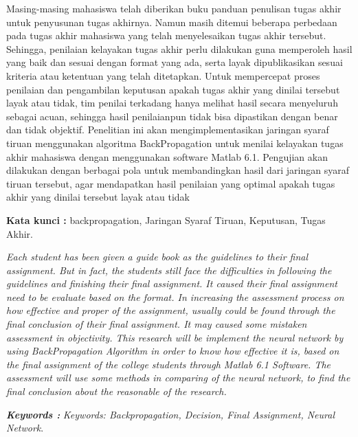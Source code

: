 \documentclass{jtetiskripsi}
\begin{document}
\tableofcontents
{}
\listoffigures
{}


\begin{abstractind}
Masing-masing mahasiswa telah diberikan buku panduan penulisan tugas akhir untuk
penyusunan tugas akhirnya. Namun masih ditemui beberapa perbedaan pada tugas akhir
mahasiswa yang telah menyelesaikan tugas akhir tersebut. Sehingga, penilaian kelayakan tugas
akhir perlu dilakukan guna memperoleh hasil yang baik dan sesuai dengan format yang ada,
serta layak dipublikasikan sesuai kriteria atau ketentuan yang telah ditetapkan. Untuk
mempercepat proses penilaian dan pengambilan keputusan apakah tugas akhir yang dinilai
tersebut layak atau tidak, tim penilai terkadang hanya melihat hasil secara menyeluruh sebagai
acuan, sehingga hasil penilaianpun tidak bisa dipastikan dengan benar dan tidak objektif.
Penelitian ini akan mengimplementasikan jaringan syaraf tiruan menggunakan algoritma
BackPropagation untuk menilai kelayakan tugas akhir mahasiswa dengan menggunakan
software Matlab 6.1. Pengujian akan dilakukan dengan berbagai pola untuk membandingkan
hasil dari jaringan syaraf tiruan tersebut, agar mendapatkan hasil penilaian yang optimal
apakah tugas akhir yang dinilai tersebut layak atau tidak

\bigskip
\noindent
\textbf{Kata kunci :} backpropagation, Jaringan Syaraf Tiruan, Keputusan, Tugas Akhir.
\end{abstractind}

\begin{abstracteng}
\emph{
Each student has been given a guide book as the guidelines to their final assignment.
But in fact, the students still face the difficulties in following the guidelines and finishing their
final assignment. It caused their final assignment need to be evaluate based on the format. In
increasing the assessment process on how effective and proper of the assignment, usually could
be found through the final conclusion of their final assignment. It may caused some mistaken
assessment in objectivity. This research will be implement the neural network by using
BackPropagation Algorithm in order to know how effective it is, based on the final assignment
of the college students through Matlab 6.1 Software. The assessment will use some methods in
comparing of the neural network, to find the final conclusion about the reasonable of the
research.}

\bigskip
\noindent
\textbf{\emph{Keywords :}} \emph{
	Keywords: Backpropagation, Decision, Final Assignment, Neural Network}.
\end{abstracteng}
\end{document}
